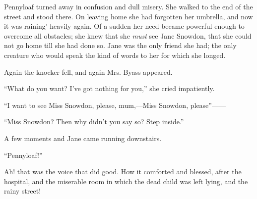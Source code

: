 Pennyloaf turned away in confusion and dull {}misery. She walked to the
end of the street and stood there. On leaving home she had forgotten her
umbrella, and now it was raining' heavily again. Of a sudden her need
became powerful enough to overcome all obstacles; she knew that she
\emph{must} see Jane Snowdon, that she could not go home till she had
done so. Jane was the only friend she had; the only creature who would
speak the kind of words to her for which she longed.

Again the knocker fell, and again Mrs. Byass appeared.

``What do you want? I've got nothing for you,'' she cried impatiently.

``I want to see Miss Snowdon, please, mum,---Miss Snowdon,
please''{{------}}

``Miss Snowdon? Then why didn't you say so? Step inside.''

A few moments and Jane came running downstairs.

``Pennyloaf!''

Ah! that was the voice that did good. How it comforted and blessed,
after the hospital, and the miserable room in which the dead child was
left lying, and the rainy street!

